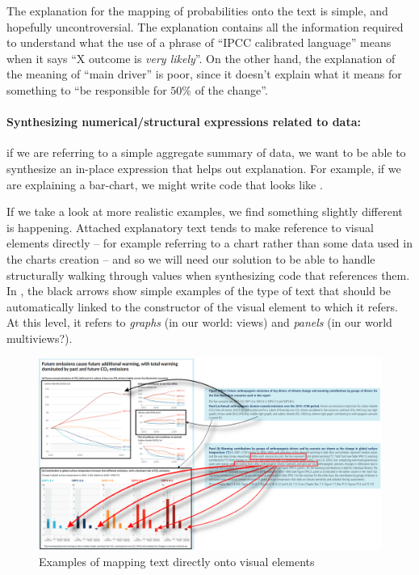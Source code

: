 The explanation for the mapping of probabilities onto the text is simple,
and hopefully uncontroversial. The explanation contains all the information
required to understand what the use of a phrase of ``IPCC calibrated language''
means when it says ``X outcome is \textit{very likely}''. On the other hand,
the explanation of the meaning of ``main driver'' is poor, since it doesn't explain
what it means for something to ``be responsible for $50\%$ of the change''. 

\paragraph*{Synthesizing numerical/structural expressions related to data:}

if we are referring to a simple aggregate summary of data, we want to be able
to synthesize an in-place expression that helps out explanation. For example,
if we are explaining a bar-chart, we might write code that looks like .

If we take a look at more realistic examples, we find something slightly different is
happening. Attached explanatory text tends to make reference to visual elements directly
-- for example referring to a chart rather than some data used in the charts creation --
and so we will need our solution to be able to handle structurally walking through values
when synthesizing code that references them. In , the black
arrows show simple examples of the type of text that should be automatically linked to
the constructor of the visual element to which it refers. At this level, it refers to
\textit{graphs} (in our world: views) and \textit{panels} (in our world multiviews?).


\begin{figure}
   \includegraphics[width=\textwidth]{fig/ipcc-visual-elements.png}
   \caption{Examples of mapping text directly onto visual elements}
   \label{fig:structural-mappings}
\end{figure}
